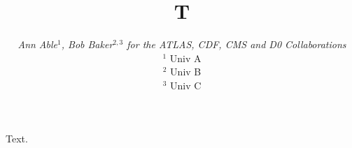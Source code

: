 \documentclass{article}
\begin{document}
\title{T}
\author{{\slshape Ann Able$^1$, Bob Baker$^{2,3}$ for the ATLAS, CDF, CMS and D0 Collaborations}\\[1ex]
$^1$ Univ A\\
$^2$ Univ B \\
$^3$ Univ C}
\maketitle
Text.
\end{document}
